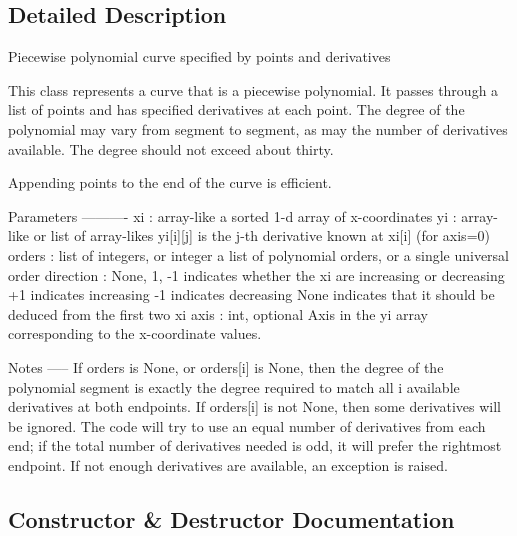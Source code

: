 \subsection{Detailed Description}
\begin{DoxyVerb}Piecewise polynomial curve specified by points and derivatives

This class represents a curve that is a piecewise polynomial. It
passes through a list of points and has specified derivatives at
each point. The degree of the polynomial may vary from segment to
segment, as may the number of derivatives available. The degree
should not exceed about thirty.

Appending points to the end of the curve is efficient.

Parameters
----------
xi : array-like
    a sorted 1-d array of x-coordinates
yi : array-like or list of array-likes
    yi[i][j] is the j-th derivative known at xi[i]   (for axis=0)
orders : list of integers, or integer
    a list of polynomial orders, or a single universal order
direction : {None, 1, -1}
    indicates whether the xi are increasing or decreasing
    +1 indicates increasing
    -1 indicates decreasing
    None indicates that it should be deduced from the first two xi
axis : int, optional
    Axis in the yi array corresponding to the x-coordinate values.

Notes
-----
If orders is None, or orders[i] is None, then the degree of the
polynomial segment is exactly the degree required to match all i
available derivatives at both endpoints. If orders[i] is not None,
then some derivatives will be ignored. The code will try to use an
equal number of derivatives from each end; if the total number of
derivatives needed is odd, it will prefer the rightmost endpoint. If
not enough derivatives are available, an exception is raised.\end{DoxyVerb}
 

\subsection{Constructor \& Destructor Documentation}
\hypertarget{classscipy_1_1interpolate_1_1polyint_1_1PiecewisePolynomial_a3ea5e7d29c3df1aae2b2dacffe61ca6d}{}
